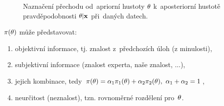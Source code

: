 \begin{figure}[h]
	\centering  
	\caption{Naznačení přechodu od~apriorní hustoty $\theta$ k~aposteriorní hustotě pravděpodobnosti $\theta|\textbf{x}$ při~daných datech.}
	\label{pic1.2}
\end{figure}

$\pi(\theta)$ může představovat:\begin{enumerate}[	a)]
	\item objektivní informace, tj. znalost z~předchozích úloh (z minulosti),
	\item subjektivní informace (znalost experta, naše znalost, ...),
	\item jejich kombinace, tedy $\pi(\theta)=\alpha_1\pi_1(\theta)+\alpha_2\pi_2(\theta),~\alpha_1+\alpha_2=1$,
	\item neurčitost (neznalost), tzn. rovnoměrné rozdělení pro~$\theta$.
\end{enumerate}

